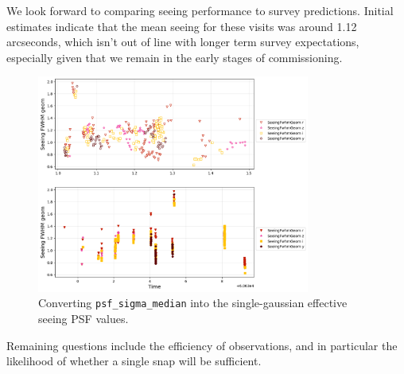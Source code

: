   
We look forward to comparing seeing performance to survey predictions. Initial estimates indicate that the mean seeing for these visits was around 1.12 arcseconds, which isn't out of line with longer term survey expectations, especially given that we remain in the early stages of commissioning. 

\begin{figure}
    \centering
    \includegraphics[width=0.8\textwidth]{sp/seeing.png}
    \caption{Converting \texttt{psf\_sigma\_median} into the single-gaussian effective seeing PSF values.}
    \label{fig:seeing}
    \end{figure}
    
   
Remaining questions include the efficiency of observations, and in particular the likelihood of whether a single snap will be sufficient. 